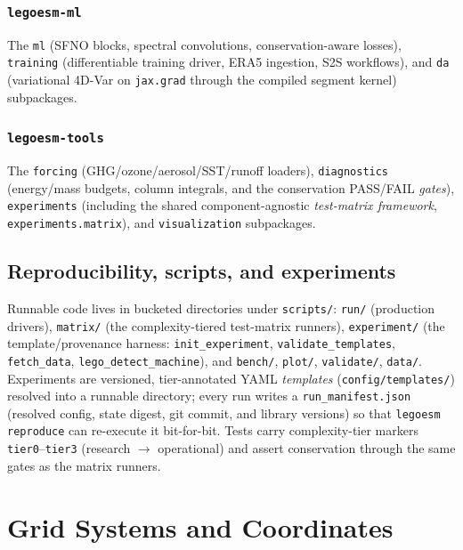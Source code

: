 \documentclass[11pt,twoside]{report}
\begin{document}
\subsection{\texttt{legoesm-ml}}
The \texttt{ml} (SFNO blocks, spectral convolutions, conservation-aware losses),
\texttt{training} (differentiable training driver, ERA5 ingestion, S2S
workflows), and \texttt{da} (variational 4D-Var on \texttt{jax.grad} through the
compiled segment kernel) subpackages.

\subsection{\texttt{legoesm-tools}}
The \texttt{forcing} (GHG/ozone/aerosol/SST/runoff loaders), \texttt{diagnostics}
(energy/mass budgets, column integrals, and the conservation PASS/FAIL
\emph{gates}), \texttt{experiments} (including the shared component-agnostic
\emph{test-matrix framework}, \texttt{experiments.matrix}), and
\texttt{visualization} subpackages.

\section{Reproducibility, scripts, and experiments}
\label{sec:arch-reproducibility}

Runnable code lives in bucketed directories under \texttt{scripts/}:
\texttt{run/} (production drivers), \texttt{matrix/} (the complexity-tiered
test-matrix runners), \texttt{experiment/} (the template/provenance harness:
\texttt{init\_experiment}, \texttt{validate\_templates}, \texttt{fetch\_data},
\texttt{lego\_detect\_machine}), and \texttt{bench/}, \texttt{plot/},
\texttt{validate/}, \texttt{data/}.  Experiments are versioned, tier-annotated
YAML \emph{templates} (\texttt{config/templates/}) resolved into a runnable
directory; every run writes a \texttt{run\_manifest.json} (resolved config,
state digest, git commit, and library versions) so that
\texttt{legoesm reproduce} can re-execute it bit-for-bit.  Tests carry
complexity-tier markers \texttt{tier0}--\texttt{tier3} (research $\to$
operational) and assert conservation through the same gates as the matrix
runners.


\chapter{Grid Systems and Coordinates}
\label{ch:grids}
\end{document}
